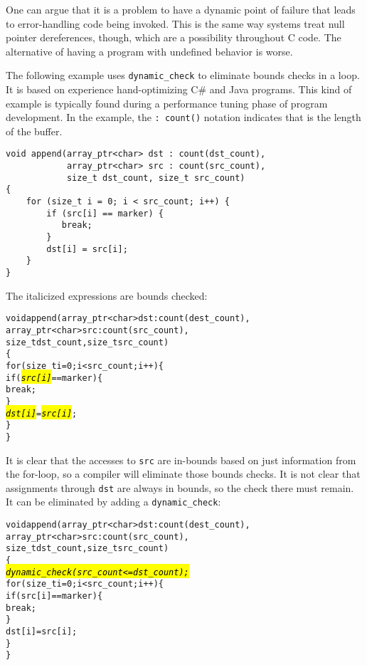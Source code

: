 One can argue that it is a problem to have a dynamic point of failure
that leads to error-handling code being invoked. This is the same way
systems treat null pointer dereferences, though, which are a possibility
throughout C code. The alternative of having a program with undefined
behavior is worse.

The following example uses \texttt{dynamic\_check} to eliminate bounds
checks in a loop. It is based on experience hand-optimizing C\# and Java
programs. This kind of example is typically found during a performance
tuning phase of program development. In the example, 
the \verb|: count(|\verb|)| notation indicates that  is the
length of the buffer.

\begin{verbatim}
void append(array_ptr<char> dst : count(dst_count),
            array_ptr<char> src : count(src_count), 
            size_t dst_count, size_t src_count)
{ 
    for (size_t i = 0; i < src_count; i++) {
        if (src[i] == marker) {
           break;
        }
        dst[i] = src[i];
    }
}
\end{verbatim}

The italicized expressions are bounds checked:
\begin{alltt}
void append(array\_ptr<char> dst: count(dest\_count), 
            array\_ptr<char> src : count(src\_count), 
            size\_t dst\_count, size\_t src\_count)
\{ 
    for (size\_t i = 0; i < src\_count; i++) \{
        if (\hl{\textit{src[i]}} == marker) \{
           break;
        \}
        \hl{\textit{dst[i]}} = \hl{\textit{src[i]}};
    \}
\}
\end{alltt}

It is clear that the accesses to \texttt{src} are in-bounds based on
just information from the for-loop, so a compiler will eliminate those
bounds checks. It is not clear that assignments through \texttt{dst} are
always in bounds, so the check there must remain. It can be eliminated
by adding a \texttt{dynamic\_check}:

\begin{alltt}
void append(array\_ptr<char> dst: count(dest\_count), 
            array\_ptr<char> src : count(src\_count), 
            size\_t dst\_count, size\_t src\_count)
\{ 
    \hl{\textit{dynamic\_check(src\_count <= dst\_count);}}
    for (size\_t i = 0; i < src\_count; i++) \{
        if (src[i] == marker) \{
            break;
        \}
        dst[i] = src[i];
    \}
\}
\end{alltt}

